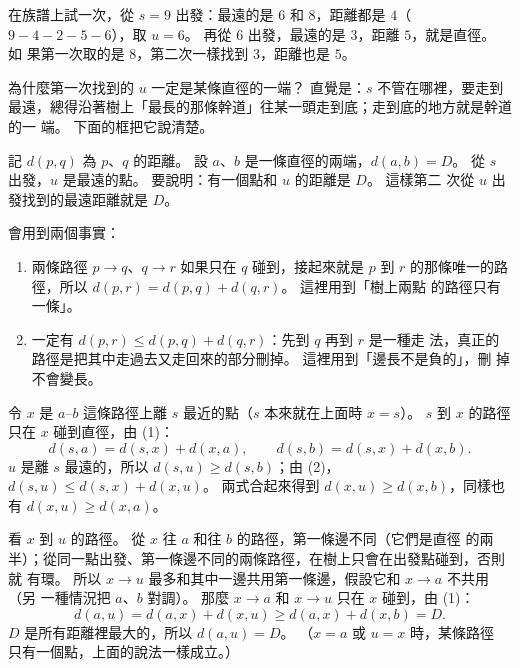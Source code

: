 在族譜上試一次，從 $s = 9$ 出發：最遠的是 $6$ 和 $8$，距離都是 $4$（$9 - 4 - 2
- 5 - 6$），取 $u = 6$。 再從 $6$ 出發，最遠的是 $3$，距離 $5$，就是直徑。 如
果第一次取的是 $8$，第二次一樣找到 $3$，距離也是 $5$。

為什麼第一次找到的 $u$ 一定是某條直徑的一端？ 直覺是：$s$ 不管在哪裡，要走到
最遠，總得沿著樹上「最長的那條幹道」往某一頭走到底；走到底的地方就是幹道的一
端。 下面的框把它說清楚。

\begin{whybox}[兩次走訪]
記 $d(p, q)$ 為 $p$、$q$ 的距離。 設 $a$、$b$ 是一條直徑的兩端，$d(a, b) = D$。
從 $s$ 出發，$u$ 是最遠的點。 要說明：有一個點和 $u$ 的距離是 $D$。 這樣第二
次從 $u$ 出發找到的最遠距離就是 $D$。

會用到兩個事實：

\begin{enumerate}
\item[(1)] 兩條路徑 $p \to q$、$q \to r$ 如果只在 $q$ 碰到，接起來就是 $p$ 到
$r$ 的那條唯一的路徑，所以 $d(p, r) = d(p, q) + d(q, r)$。 這裡用到「樹上兩點
的路徑只有一條」。
\item[(2)] 一定有 $d(p, r) \le d(p, q) + d(q, r)$：先到 $q$ 再到 $r$ 是一種走
法，真正的路徑是把其中走過去又走回來的部分刪掉。 這裡用到「邊長不是負的」，刪
掉不會變長。
\end{enumerate}

\begin{center}
\label{fig:tree-proof}
\end{center}

令 $x$ 是 $a$--$b$ 這條路徑上離 $s$ 最近的點（$s$ 本來就在上面時 $x = s$）。
$s$ 到 $x$ 的路徑只在 $x$ 碰到直徑，由 (1)：
\[
d(s, a) = d(s, x) + d(x, a), \qquad d(s, b) = d(s, x) + d(x, b).
\]
$u$ 是離 $s$ 最遠的，所以 $d(s, u) \ge d(s, b)$；由 (2)，$d(s, u) \le d(s, x) +
d(x, u)$。 兩式合起來得到 $d(x, u) \ge d(x, b)$，同樣也有 $d(x, u) \ge d(x,
a)$。

看 $x$ 到 $u$ 的路徑。 從 $x$ 往 $a$ 和往 $b$ 的路徑，第一條邊不同（它們是直徑
的兩半）；從同一點出發、第一條邊不同的兩條路徑，在樹上只會在出發點碰到，否則就
有環。 所以 $x \to u$ 最多和其中一邊共用第一條邊，假設它和 $x \to a$ 不共用（另
一種情況把 $a$、$b$ 對調）。 那麼 $x \to a$ 和 $x \to u$ 只在 $x$ 碰到，由
(1)：
\[
d(a, u) = d(a, x) + d(x, u) \ge d(a, x) + d(x, b) = D.
\]
$D$ 是所有距離裡最大的，所以 $d(a, u) = D$。 （$x = a$ 或 $u = x$ 時，某條路徑
只有一個點，上面的說法一樣成立。）
\end{whybox}

